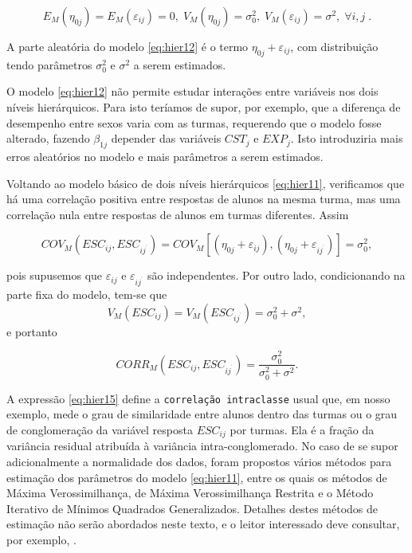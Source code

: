 \documentclass[]{book}
\numberwithin{example}{chapter}
\numberwithin{remark}{chapter}
\numberwithin{definition}{chapter}
\begin{document}
\begin{equation}
E_{M}\left( \eta _{0j}\right) =E_{M}\left( \varepsilon _{ij}\right)
=0,\;V_{M}\left( \eta _{0j}\right) =\sigma _{0}^{2},\;V_{M}\left(
\varepsilon _{ij}\right) =\sigma ^{2},\;\forall i,j\;.  \label{eq:hier13}
\end{equation}

A parte aleatória do modelo \eqref{eq:hier12} é o termo
\(\eta _{0j}+\varepsilon _{ij}\), com distribuição tendo parâmetros
\(\sigma _{0}^{2}\) e \(\sigma ^{2}\) a serem estimados.

O modelo \eqref{eq:hier12} não permite estudar interações entre variáveis
nos dois níveis hierárquicos. Para isto teríamos de supor, por exemplo,
que a diferença de desempenho entre sexos varia com as turmas,
requerendo que o modelo fosse alterado, fazendo \(\beta _{1j}\) depender
das variáveis \(CST_{j}\) e \(EXP_{j}\). Isto introduziria mais erros
aleatórios no modelo e mais parâmetros a serem estimados.

Voltando ao modelo básico de dois níveis hierárquicos \eqref{eq:hier11},
verificamos que há uma correlação positiva entre respostas de alunos na
mesma turma, mas uma correlação nula entre respostas de alunos em turmas
diferentes. Assim

\begin{equation}
COV_{M}\left( ESC_{ij},ESC_{ij^{^{\prime }}}\right) =COV_{M}\left[ \left(
\eta _{0j}+\varepsilon _{ij}\right) ,\left( \eta _{0j}+\varepsilon
_{ij^{^{\prime }}}\right) \right] =\sigma _{0}^{2},  \label{eq:hier14}
\end{equation}

pois supusemos que \(\varepsilon _{ij}\) e
\(\varepsilon _{ij^{^{\prime }}}\) são independentes. Por outro lado,
condicionando na parte fixa do modelo, tem-se que \[
V_{M}\left( ESC_{ij}\right) =V_{M}\left( ESC_{ij^{^{\prime }}}\right)
=\sigma _{0}^{2}+\sigma ^{2}, 
\] e portanto

\begin{equation}
CORR_{M}\left( ESC_{ij},ESC_{ij^{^{\prime }}}\right) = \frac{\sigma_{0}^{2}}{\sigma _{0}^{2}+\sigma ^{2}}.  \label{eq:hier15}
\end{equation}

A expressão \eqref{eq:hier15} define a \texttt{correlação\ intraclasse}
usual que, em nosso exemplo, mede o grau de similaridade entre alunos
dentro das turmas ou o grau de conglomeração da variável resposta
\(ESC_{ij}\) por turmas. Ela é a fração da variância residual atribuída
à variância intra-conglomerado. No caso de se supor adicionalmente a
normalidade dos dados, foram propostos vários métodos para estimação dos
parâmetros do modelo \eqref{eq:hier11}, entre os quais os métodos de
Máxima Verossimilhança, de Máxima Verossimilhança Restrita e o Método
Iterativo de Mínimos Quadrados Generalizados. Detalhes destes métodos de
estimação não serão abordados neste texto, e o leitor interessado deve
consultar, por exemplo, \citep{bryk}.
\end{document}
